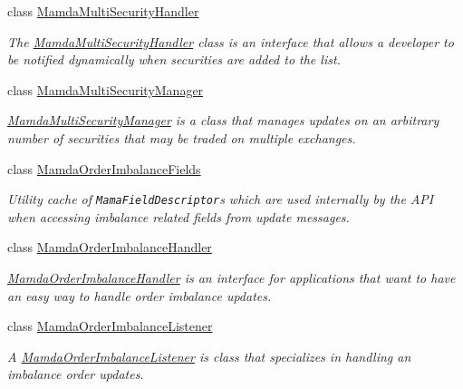 \begin{CompactItemize}
class \hyperlink{classWombat_1_1MamdaMultiSecurityHandler}{Mamda\-Multi\-Security\-Handler}
\begin{CompactList}\small\item\em The \hyperlink{classWombat_1_1MamdaMultiSecurityHandler}{Mamda\-Multi\-Security\-Handler} class is an interface that allows a developer to be notified dynamically when securities are added to the list. \item\end{CompactList}\item 
class \hyperlink{classWombat_1_1MamdaMultiSecurityManager}{Mamda\-Multi\-Security\-Manager}
\begin{CompactList}\small\item\em \hyperlink{classWombat_1_1MamdaMultiSecurityManager}{Mamda\-Multi\-Security\-Manager} is a class that manages updates on an arbitrary number of securities that may be traded on multiple exchanges. \item\end{CompactList}\item 
class \hyperlink{classWombat_1_1MamdaOrderImbalanceFields}{Mamda\-Order\-Imbalance\-Fields}
\begin{CompactList}\small\item\em Utility cache of {\tt Mama\-Field\-Descriptor}s which are used internally by the API when accessing imbalance related fields from update messages. \item\end{CompactList}\item 
class \hyperlink{classWombat_1_1MamdaOrderImbalanceHandler}{Mamda\-Order\-Imbalance\-Handler}
\begin{CompactList}\small\item\em \hyperlink{classWombat_1_1MamdaOrderImbalanceHandler}{Mamda\-Order\-Imbalance\-Handler} is an interface for applications that want to have an easy way to handle order imbalance updates. \item\end{CompactList}\item 
class \hyperlink{classWombat_1_1MamdaOrderImbalanceListener}{Mamda\-Order\-Imbalance\-Listener}
\begin{CompactList}\small\item\em A \hyperlink{classWombat_1_1MamdaOrderImbalanceListener}{Mamda\-Order\-Imbalance\-Listener} is class that specializes in handling an imbalance order updates. \item\end{CompactList}\item 

\end{CompactItemize}

